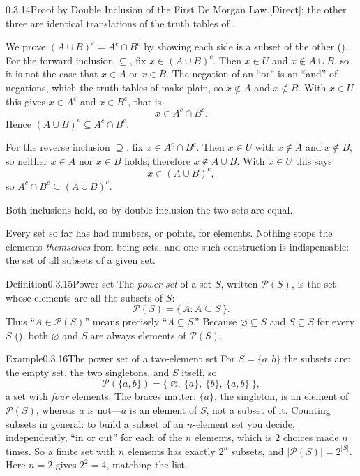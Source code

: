 \documentclass[main.tex]{subfiles}
\begin{document}
\begin{Prf}{0.3.14}{Proof by Double Inclusion of the First De Morgan Law.}{[Direct]; the
other three are identical translations of the truth tables of .}
\item We prove $(A\cup B)^{c}=A^{c}\cap B^{c}$ by showing each side is a subset of the other
(). For the forward inclusion $\subseteq$, fix $x\in(A\cup B)^{c}$. Then $x\in U$ and
$x\notin A\cup B$, so it is not the case that $x\in A$ or $x\in B$. The negation of an ``or'' is an
``and'' of negations, which the truth tables of  make plain, so $x\notin A$ and $x\notin
B$. With $x\in U$ this gives $x\in A^{c}$ and $x\in B^{c}$, that is,
\[
x\in A^{c}\cap B^{c}.
\]
Hence $(A\cup B)^{c}\subseteq A^{c}\cap B^{c}$.
\item For the reverse inclusion $\supseteq$, fix $x\in A^{c}\cap B^{c}$. Then $x\in U$ with $x\notin
A$ and $x\notin B$, so neither $x\in A$ nor $x\in B$ holds; therefore $x\notin A\cup B$. With $x\in U$
this says
\[
x\in(A\cup B)^{c},
\]
so $A^{c}\cap B^{c}\subseteq(A\cup B)^{c}$.
\item Both inclusions hold, so by double inclusion the two sets are equal.
\end{Prf}

\noindent Every set so far has had numbers, or points, for elements. Nothing stops the elements
\emph{themselves} from being sets, and one such construction is indispensable: the set of all subsets
of a given set.

\begin{Obj}{Definition}{0.3.15}{Power set}
The \emph{power set} of a set $S$, written $\mathcal P(S)$, is the set whose elements are all the
subsets of $S$:
\[
\mathcal P(S)=\{\,A : A\subseteq S\,\}.
\]
Thus ``$A\in\mathcal P(S)$'' means precisely ``$A\subseteq S$.'' Because $\varnothing\subseteq S$ and
$S\subseteq S$ for every $S$ (), both $\varnothing$ and $S$ are always elements of
$\mathcal P(S)$.
\end{Obj}

\begin{ObjL}{Example}{0.3.16}{The power set of a two-element set}
For $S=\{a,b\}$ the subsets are: the empty set, the two singletons, and $S$ itself, so
\[
\mathcal P(\{a,b\})=\bigl\{\ \varnothing,\ \{a\},\ \{b\},\ \{a,b\}\ \bigr\},
\]
a set with \emph{four} elements. The braces matter: $\{a\}$, the singleton, is an element of
$\mathcal P(S)$, whereas $a$ is not---$a$ is an element of $S$, not a subset of it. Counting subsets
in general: to build a subset of an $n$-element set you decide, independently, ``in or out'' for each
of the $n$ elements, which is $2$ choices made $n$ times. So a finite set with $n$ elements has
exactly $2^{n}$ subsets, and $\lvert\mathcal P(S)\rvert=2^{\lvert S\rvert}$. Here $n=2$ gives
$2^{2}=4$, matching the list.
\end{ObjL}
\end{document}
